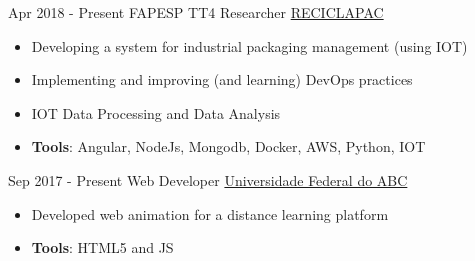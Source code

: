 \documentclass[letterpaper]{twentysecondcv} %
\begin{document}


\begin{twenty} %
\twentyitem
    	{Apr 2018 -}
		{Present}
        {FAPESP TT4 Researcher}
        {\href{}{RECICLAPAC}}
        {}
        {\begin{itemize}
        \item Developing a system for industrial packaging management (using IOT)
        \item Implementing and improving (and learning) DevOps practices
        \item IOT Data Processing and Data Analysis
        \item \textbf{Tools}: Angular, NodeJs, Mongodb, Docker, AWS, Python, IOT \vspace{2mm}
        \end{itemize}}
        
\end{twenty}

\begin{twenty} %
\twentyitem
    	{Sep 2017 -}
		{Present}
        {Web Developer}
        {\href{}{Universidade Federal do ABC}}
        {}
        {\begin{itemize}
        \item Developed web animation for a distance learning platform
        \item \textbf{Tools}: HTML5 and JS \vspace{2mm}
        \end{itemize}}
        
\end{twenty}
\end{document}
